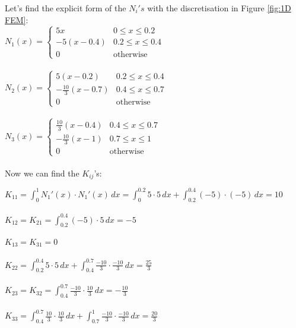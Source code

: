 \begin{example}
Let's find the explicit form of the $N_i's$ with the discretisation in Figure \ref{fig:1D FEM}:\\

    $N_1(x)=\begin{cases}
      5x                       &0\leq x\leq 0.2\\
      -5(x-0.4)                &0.2\leq x\leq0.4\\
      0  \qquad   \qquad \quad &\text{otherwise}
    \end{cases}$\\\-\\
    
    $N_2(x)=\begin{cases} 
      5(x-0.2)                  &0.2\leq x \leq 0.4 \\
      -\frac{10}{3}(x-0.7)      &0.4\leq x \leq 0.7 \\
      0  \qquad   \qquad \quad  &\text{otherwise}
    \end{cases}$\\\-\\
    
    $N_3(x)=\begin{cases} 
      \frac{10}{3}(x-0.4)       &0.4\leq x \leq 0.7 \\
      -\frac{10}{3}(x-1)        &0.7\leq x \leq 1 \\
      0  \qquad   \qquad \quad  &\text{otherwise}
    \end{cases}$\\\-\\
  
Now we can find the $K_{ij}$'s:

$\displaystyle{
  K_{11} = \int_0^1 N_1'(x)\cdot N_1'(x) \, dx = \int_0^{0.2} 5\cdot5\,dx + \int_{0.2}^{0.4} (-5)\cdot(-5)\,dx = 10}
$\\\-\\
$\displaystyle{
  K_{12}=K_{21} = \int_{0.2}^{0.4}(-5)\cdot5 \,dx = -5}
$\\\-\\
$\displaystyle{
  K_{13} = K_{31} = 0}
$\\\-\\
$\displaystyle{
  K_{22} = \int_{0.2}^{0.4}5\cdot5\,dx + \int_{0.4}^{0.7}\frac{-10}{3}\cdot\frac{-10}{3}\,dx = \frac{25}{3}}
$\\\-\\
$\displaystyle{
  K_{23}=K_{32} = \int_{0.4}^{0.7}\frac{-10}{3}\cdot\frac{10}{3}\,dx = -\frac{10}{3}}
$\\\-\\
$\displaystyle{
  K_{33} = \int_{0.4}^{0.7}\frac{10}{3}\cdot\frac{10}{3}\,dx + \int_{0.7}^1 \frac{-10}{3}\cdot\frac{-10}{3}\,dx = \frac{20}{3}}
$\\\-\\
\newpage


\end{example}
